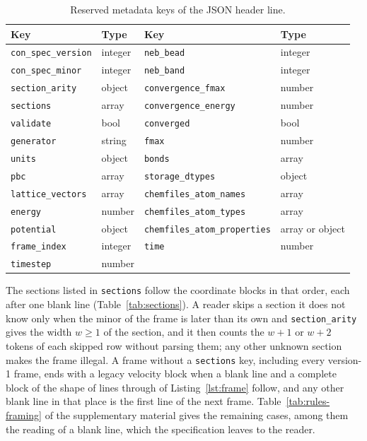 \documentclass[preprint,12pt]{elsarticle}
\begin{document}
\begin{table}[tbp] \centering \footnotesize \caption{Reserved metadata keys of the JSON header line.}
\label{tab:keys}
\begin{tabular}{ll@{\hspace{1.4em}}ll}
\toprule
Key & Type & Key & Type \\
\midrule
\texttt{con\_spec\_version} & integer & \texttt{neb\_bead} & integer \\
\texttt{con\_spec\_minor} & integer & \texttt{neb\_band} & integer \\
\texttt{section\_arity} & object & \texttt{convergence\_fmax} & number \\
\texttt{sections} & array & \texttt{convergence\_energy} & number \\
\texttt{validate} & bool & \texttt{converged} & bool \\
\texttt{generator} & string & \texttt{fmax} & number \\
\texttt{units} & object & \texttt{bonds} & array \\
\texttt{pbc} & array & \texttt{storage\_dtypes} & object \\
\texttt{lattice\_vectors} & array & \texttt{chemfiles\_atom\_names} & array \\
\texttt{energy} & number & \texttt{chemfiles\_atom\_types} & array \\
\texttt{potential} & object & \texttt{chemfiles\_atom\_properties} & array or object \\
\texttt{frame\_index} & integer & \texttt{time} & number \\
\texttt{timestep} & number & & \\
\bottomrule
\end{tabular}
\end{table}

The sections listed in \texttt{sections} follow the coordinate blocks in that order, each after one blank line (Table~\ref{tab:sections}).
A reader skips a section it does not know only when the minor of the frame is later than its own and \texttt{section\_arity} gives the width \(w\ge1\) of the section, and it then counts the \(w+1\) or \(w+2\) tokens of each skipped row without parsing them; any other unknown section makes the frame illegal.
A frame without a \texttt{sections} key, including every version-1 frame, ends with a legacy velocity block when a blank line and a complete block of the shape of lines \wkLineVelocitySymbol{} through \wkLineLastVelocity{} of Listing~\ref{lst:frame} follow, and any other blank line in that place is the first line of the next frame.
Table~\ref*{tab:rules-framing} of the supplementary material gives the remaining cases, among them the reading of a blank line, which the specification leaves to the reader.
\end{document}
